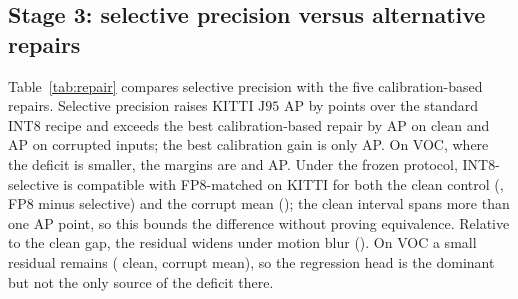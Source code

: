 \documentclass[a4paper,fleqn]{cas-dc}
\newcommand{\Jclean}{\mathrm{J95}}
\begin{document}
\subsection{Stage 3: selective precision versus alternative repairs}
\label{sec:repair-results}

\begin{table}[t]
\centering
\caption{Retraining-free repairs of the RetinaNet INT8 deficit under the frozen paired conditions. $\Jclean$: codec-control clean AP; $\Delta$: $\Jclean$ AP minus standard INT8; Corrupt: equal-weight mean over the 12 corruption--severity cells. All entries are full-sample plug-in estimates, and the margins between rows are descriptive; Section~\ref{sec:repair-results} gives the paired intervals of the bootstrap arms. Calibration rows change only the calibration images or the range estimator; max-calibration rows are single builds. KITTI selective estimates are development-contaminated (Section~\ref{sec:datasets}); Section~\ref{sec:verification} reports the unseen-image holdout. \textsuperscript{a}Original clean image; the FP32 arm predates the codec control, so no $\Delta$ is given. Bold: the proposed repair.}
\label{tab:repair}
\footnotesize
{\setlength{\tabcolsep}{3.5pt}}
\end{table}

Table~\ref{tab:repair} compares selective precision with the five calibration-based repairs. Selective precision raises KITTI $\Jclean$ AP by \nnSelGainJKitti{} points over the standard INT8 recipe and exceeds the best calibration-based repair by \nnRepSelOverCalibJKitti{} AP on clean and \nnRepSelOverCalibCKitti{} AP on corrupted inputs; the best calibration gain is only \nnRepBestCalibGainJKitti{} AP. On VOC, where the deficit is smaller, the margins are \nnRepSelOverCalibJVoc{} and \nnRepSelOverCalibCVoc{} AP. Under the frozen protocol, INT8-selective is compatible with FP8-matched on KITTI for both the clean control (\nnSelResJKitti{}, FP8 minus selective) and the corrupt mean (\nnSelResCKitti{}); the clean interval spans more than one AP point, so this bounds the difference without proving equivalence. Relative to the clean gap, the residual widens under motion blur (\nnSelFamMbKitti{}). On VOC a small residual remains (\nnSelResJVoc{} clean, \nnSelResCVoc{} corrupt mean), so the regression head is the dominant but not the only source of the deficit there.
\end{document}
